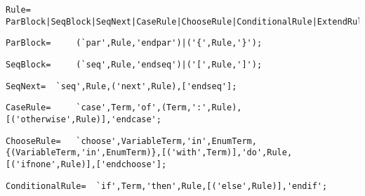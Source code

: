 \documentclass{article}
\begin{document}
    \begin{flushleft}
    \begin{lstlisting}[mathescape=true, breaklines=true]
      Rule= 	ParBlock|SeqBlock|SeqNext|CaseRule|ChooseRule|ConditionalRule|ExtendRule|ForAllRule|ImportRule|IterateRule|LetRule|TurboReturnRule|WhileRule|UpdateRule|SkipRule|CallRule|LocalRule|PrintRule;
    \end{lstlisting}
    \end{flushleft}
    \begin{flushleft}
    \begin{lstlisting}[mathescape=true, breaklines=true]
      ParBlock= 	(`par',Rule,'endpar')|('{',Rule,'}');
    \end{lstlisting}
    \end{flushleft}
    \begin{flushleft}
    \begin{lstlisting}[mathescape=true, breaklines=true]
      SeqBlock= 	(`seq',Rule,'endseq')|('[',Rule,']');
    \end{lstlisting}
    \end{flushleft}
    \begin{flushleft}
    \begin{lstlisting}[mathescape=true, breaklines=true]
      SeqNext= 	`seq',Rule,('next',Rule),['endseq'];
    \end{lstlisting}
    \end{flushleft}
    \begin{flushleft}
    \begin{lstlisting}[mathescape=true, breaklines=true]
      CaseRule= 	`case',Term,'of',(Term,':',Rule),[('otherwise',Rule)],'endcase';
    \end{lstlisting}
    \end{flushleft}
    \begin{flushleft}
    \begin{lstlisting}[mathescape=true, breaklines=true]
      ChooseRule= 	`choose',VariableTerm,'in',EnumTerm,{(VariableTerm,'in',EnumTerm)},[('with',Term)],'do',Rule,[('ifnone',Rule)],['endchoose'];
    \end{lstlisting}
    \end{flushleft}
    \begin{flushleft}
    \begin{lstlisting}[mathescape=true, breaklines=true]
      ConditionalRule= 	`if',Term,'then',Rule,[('else',Rule)],'endif';
    \end{lstlisting}
    \end{flushleft}
\end{document}
